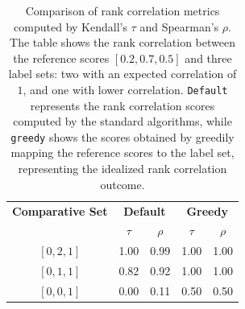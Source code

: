 \begin{table}[t]
  \centering
  \caption{Comparison of rank correlation metrics computed by Kendall's $\tau$ and Spearman's $\rho$. The table shows the rank correlation between the reference scores $[0.2,0.7,0.5]$ and three label sets: two with an expected correlation of $1$, and one with lower correlation. \texttt{Default} represents the rank correlation scores computed by the standard algorithms, while \texttt{greedy} shows the scores obtained by greedily mapping the reference scores to the label set, representing the idealized rank correlation outcome.}
  \label{tab:rank-correlation}
  \begin{tabular}{ccccc}
      \toprule
      \textbf{Comparative Set} & \multicolumn{2}{c}{\textbf{Default}} & \multicolumn{2}{c}{\textbf{Greedy}} \\
      \cmidrule(lr){2-3} \cmidrule(lr){4-5}
                               & $\tau$ & $\rho$ & $\tau$ & $\rho$ \\
      \midrule
      
      $[0, 2, 1]$ & 1.00 & 0.99  & 1.00  & 1.00 \\
      $[0, 1, 1]$ & 0.82 & 0.92  & 1.00  & 1.00 \\
      $[0, 0, 1]$ & 0.00 & 0.11  & 0.50  & 0.50 \\
      \bottomrule
  \end{tabular}
\end{table}

